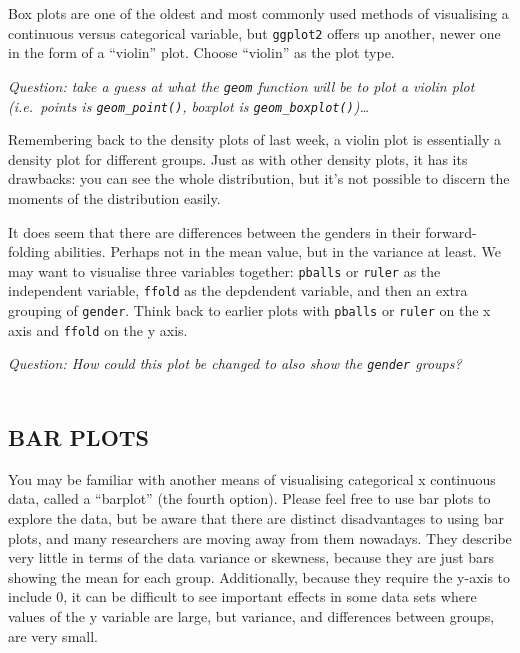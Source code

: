 \documentclass[
]{book}
\begin{document}
Box plots are one of the oldest and most commonly used methods of visualising a
continuous versus categorical variable, but \texttt{ggplot2} offers up another, newer
one in the form of a ``violin'' plot. Choose ``violin'' as the plot type.

\emph{Question: take a guess at what the \texttt{geom} function will be to plot a violin
plot (i.e.~points is \texttt{geom\_point()}, boxplot is \texttt{geom\_boxplot()})\ldots{}}

Remembering back to the density plots of last week, a violin plot is essentially
a density plot for different groups. Just as with other density plots, it has its
drawbacks: you can see the whole distribution, but it's not possible
to discern the moments of the distribution easily.

It does seem that there are differences between the genders in their forward-folding
abilities. Perhaps not in the mean value, but in the variance at least. We may
want to visualise three variables together: \texttt{pballs} or \texttt{ruler} as the independent
variable, \texttt{ffold} as the depdendent variable, and then an extra grouping of
\texttt{gender}. Think back to earlier plots with \texttt{pballs} or \texttt{ruler} on the x axis and
\texttt{ffold} on the y axis.

\emph{Question: How could this plot be changed to also show the \texttt{gender} groups?}\\
~\\

\hypertarget{bar-plots}{%
\subsection{BAR PLOTS}\label{bar-plots}}

You may be familiar with another means of visualising categorical x continuous
data, called a ``barplot'' (the fourth option). Please feel free to use bar plots to
explore the data, but be aware that there are distinct disadvantages to
using bar plots, and many researchers are moving away from them nowadays. They
describe very little in terms of the data variance or skewness, because they are just
bars showing the mean for each group. Additionally, because they require the y-axis to
include 0, it can be difficult to see important effects in some data sets
where values of the y variable are large, but variance, and differences between
groups, are very small.\\
~\\
\end{document}
